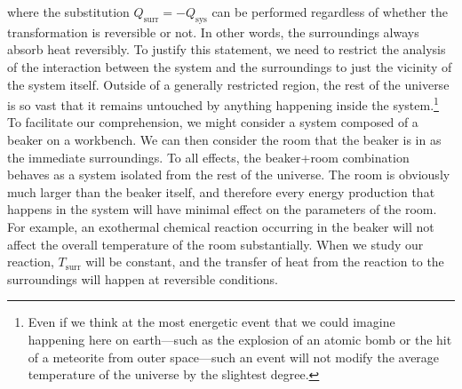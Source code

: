\documentclass[
]{book}
\theoremstyle{definition}
\theoremstyle{definition}
\theoremstyle{definition}
\theoremstyle{remark}
\begin{document}
where the substitution \(Q_{\text{surr}}=-Q_{\text{sys}}\) can be performed regardless of whether the transformation is reversible or not. In other words, the surroundings always absorb heat reversibly. To justify this statement, we need to restrict the analysis of the interaction between the system and the surroundings to just the vicinity of the system itself. Outside of a generally restricted region, the rest of the universe is so vast that it remains untouched by anything happening inside the system.\footnote{Even if we think at the most energetic event that we could imagine happening here on earth---such as the explosion of an atomic bomb or the hit of a meteorite from outer space---such an event will not modify the average temperature of the universe by the slightest degree.} To facilitate our comprehension, we might consider a system composed of a beaker on a workbench. We can then consider the room that the beaker is in as the immediate surroundings. To all effects, the beaker+room combination behaves as a system isolated from the rest of the universe. The room is obviously much larger than the beaker itself, and therefore every energy production that happens in the system will have minimal effect on the parameters of the room. For example, an exothermal chemical reaction occurring in the beaker will not affect the overall temperature of the room substantially. When we study our reaction, \(T_{\text{surr}}\) will be constant, and the transfer of heat from the reaction to the surroundings will happen at reversible conditions.
\end{document}
